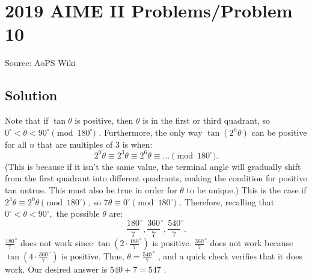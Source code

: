 \documentclass[12pt]{article}
\begin{document}
\section*{{2019 AIME II Problems/Problem 10}}
Source: AoPS Wiki

\subsection*{Solution}
Note that if $\tan \theta$ is positive, then $\theta$ is in the first or third quadrant, so $0^{\circ} < \theta < 90^{\circ} \pmod{180^{\circ}}$ . Furthermore, the only way $\tan{\left(2^{n}\theta\right)}$ can be positive for all $n$ that are multiples of $3$ is when: \[2^0\theta \equiv 2^3\theta \equiv 2^6\theta \equiv ... \pmod{180^{\circ}}.\] (This is because if it isn't the same value, the terminal angle will gradually shift from the first quadrant into different quadrants, making the condition for positive tan untrue. This must also be true in order for $\theta$ to be unique.) This is the case if $2^3\theta \equiv 2^0\theta \pmod{180^{\circ}}$ , so $7\theta \equiv 0^{\circ} \pmod{180^{\circ}}$ . Therefore, recalling that $0^{\circ}<\theta<90^{\circ},$ the possible $\theta$ are: \[\frac{180}{7}^{\circ}, \frac{360}{7}^{\circ}, \frac{540}{7}^{\circ}.\] $\frac{180}{7}^{\circ}$ does not work since $\tan\left(2 \cdot \frac{180}{7}^{\circ}\right)$ is positive. $\frac{360}{7}^{\circ}$ does not work because $\tan\left(4 \cdot \frac{360}{7}^{\circ}\right)$ is positive. Thus, $\theta = \frac{540}{7}^{\circ}$ , and a quick check verifies that it does work. Our desired answer is $540 + 7 = \boxed{547}$ .
\end{document}
